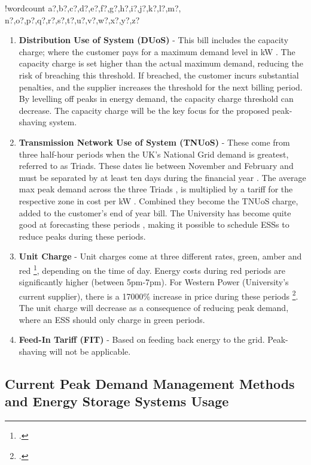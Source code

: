 \documentclass[fontsize=9.5pt]{extarticle}
\numberwithin{figure}{section} %
\newcounter{words}
\newenvironment{counted}{%
  \setcounter{words}{0}
  \SearchList!{wordcount}{\stepcounter{words}}
    {a?,b?,c?,d?,e?,f?,g?,h?,i?,j?,k?,l?,m?,
    n?,o?,p?,q?,r?,s?,t?,u?,v?,w?,x?,y?,z?}
  \UndoBoundary{'}
  \SearchOrder{p;}}{%
  \StopSearching}
\begin{document}
\begin{counted}
\begin{enumerate}
\item \textbf{Distribution Use of System (DUoS)} - This bill includes the capacity charge; where the customer pays for a maximum demand level in kW \cite{Deconstr52:online}. The capacity charge is set higher than the actual maximum demand, reducing the risk of breaching this threshold. If breached, the customer incurs substantial penalties, and the supplier increases the threshold for the next billing period. By levelling off peaks in energy demand, the capacity charge threshold can decrease. The capacity charge will be the key focus for the proposed peak-shaving system.
\item \textbf{Transmission Network Use of System (TNUoS)} - These come from three half-hour periods when the UK's National Grid demand is greatest, referred to as Triads. These dates lie between November and February and must be separated by at least ten days during the financial year \cite{TriadsWh7:online}. The average max peak demand across the three Triads \cite{TNUoSTra99:online}, is multiplied by a tariff for the respective zone in cost per kW \cite{TNUoScha93:online}. Combined they become the TNUoS charge, added to the customer's end of year bill. The University has become quite good at forecasting these periods \cite{Jbrentmeet}, making it possible to schedule ESSs to reduce peaks during these periods.
\item \textbf{Unit Charge} - Unit charges come at three different rates, green, amber and red \footcite[See page 27 of][]{SWEB201492:online}, depending on the time of day. Energy costs during red periods are significantly higher (between 5pm-7pm). For Western Power (University's current supplier), there is a 17000\% increase in price during these periods \footcite[25.405 p/kWh in red periods against 0.147p/kWh in green periods][]{SWEB201492:online}. The unit charge will decrease as a consequence of reducing peak demand, where an ESS should only charge in green periods.
\item \textbf{Feed-In Tariff (FIT)} - Based on feeding back energy to the grid. Peak-shaving will not be applicable.
\end{enumerate}

\subsection{Current Peak Demand Management Methods and Energy Storage
Systems
Usage}\label{current-peak-demand-management-methods-and-energy-storage-systems-usage}


\end{counted}
\end{document}

